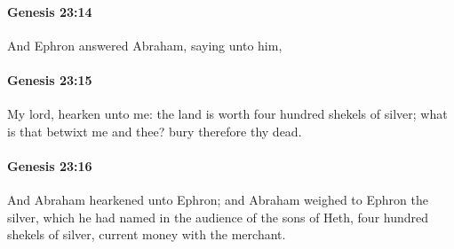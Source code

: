 		\paragraph{Genesis 23:14} %
			\label{GENESIS-23-14}

			And Ephron answered Abraham, saying unto him,


		\paragraph{Genesis 23:15} %
			\label{GENESIS-23-15}

			My lord, hearken unto me: the land is worth four hundred shekels of silver; what is that betwixt me and thee?  bury therefore thy dead.


		\paragraph{Genesis 23:16} %
			\label{GENESIS-23-16}

			And Abraham hearkened unto Ephron; and Abraham weighed to Ephron the silver, which he had named in the audience of the sons of Heth, four hundred shekels of silver, current money with the merchant.


